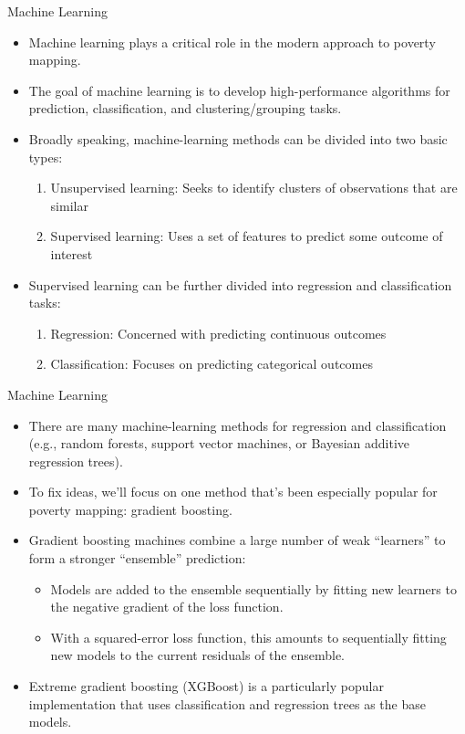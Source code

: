 \documentclass[aspectratio=169, xcolor=dvipsnames]{beamer}
\begin{document}
\begin{frame}{Machine Learning}
\begin{itemize}
\item Machine learning plays a critical role in the modern approach to poverty 
mapping.
\pause
\item The goal of machine learning is to develop high-performance algorithms for 
prediction, classification, and clustering/grouping tasks.
\pause
\item Broadly speaking, machine-learning methods can be divided into two basic types:
\begin{enumerate}
\item Unsupervised learning: Seeks to identify clusters of observations that are
similar
\item Supervised learning: Uses a set of features to predict some outcome of
interest
\end{enumerate}
\pause
\item Supervised learning can be further divided into regression and classification tasks:
\begin{enumerate}
\item Regression: Concerned with predicting continuous outcomes
\item Classification: Focuses on predicting categorical outcomes
\end{enumerate}
\end{itemize}
\end{frame}

\begin{frame}{Machine Learning}
\begin{itemize}
\item There are many machine-learning methods for regression and classification 
(e.g., random forests, support vector machines, or Bayesian additive regression trees).
\pause
\item To fix ideas, we'll focus on one method that's been especially popular for poverty
mapping: gradient boosting.
\pause
\item Gradient boosting machines combine a large number of weak ``learners'' to form
a stronger ``ensemble'' prediction:
\begin{itemize}
\item Models are added to the ensemble sequentially by fitting new learners to the 
negative gradient of the loss function.
\item With a squared-error loss function, this amounts to sequentially fitting new models
to the current residuals of the ensemble.
\end{itemize}
\pause
\item Extreme gradient boosting (XGBoost) is a particularly popular implementation
that uses classification and regression trees as the base models.
\end{itemize}
\end{frame}
\end{document}
